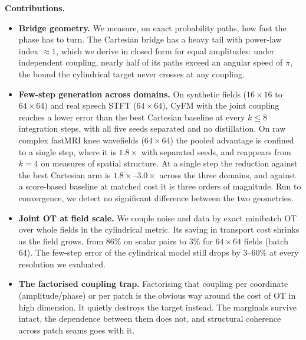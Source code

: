 \textbf{Contributions.}
\begin{itemize}
    \item \textbf{Bridge geometry.} We measure, on exact probability paths, how fast the phase has to turn. The Cartesian bridge has a heavy tail with power-law index $\approx 1$, which we derive in closed form for equal amplitudes: under independent coupling, nearly half of its paths exceed an angular speed of $\pi$, the bound the cylindrical target never crosses at any coupling.
    \item \textbf{Few-step generation across domains.} On synthetic fields ($16\times16$ to $64\times64$) and real speech STFT ($64\times64$), CyFM with the joint coupling reaches a lower error than the best Cartesian baseline at every $k \le 8$ integration steps, with all five seeds separated and no distillation. On raw complex fastMRI knee wavefields ($64\times64$) the pooled advantage is confined to a single step, where it is $1.8\times$ with separated seeds, and reappears from $k=4$ on measures of spatial structure. At a single step the reduction against the best Cartesian arm is $1.8\times$--$3.0\times$ across the three domains, and against a score-based baseline at matched cost it is three orders of magnitude. Run to convergence, we detect no significant difference between the two geometries.
    \item \textbf{Joint OT at field scale.} We couple noise and data by exact minibatch OT over whole fields in the cylindrical metric. Its saving in transport cost shrinks as the field grows, from 86\% on scalar pairs to 3\% for $64\times64$ fields (batch 64). The few-step error of the cylindrical model still drops by 3--60\% at every resolution we evaluated.
    \item \textbf{The factorised coupling trap.} Factorising that coupling per coordinate (amplitude/phase) or per patch is the obvious way around the cost of OT in high dimension. It quietly destroys the target instead. The marginals survive intact, the dependence between them does not, and structural coherence across patch seams goes with it.
\end{itemize}
